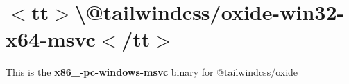 \chapter{\texorpdfstring{$<$}{<}tt\texorpdfstring{$>$}{>}\textbackslash{}@tailwindcss/oxide-\/win32-\/x64-\/msvc\texorpdfstring{$<$}{<}/tt\texorpdfstring{$>$}{>}}
\hypertarget{md__project5___h_r_2_project5___h_r___front___end_2node__modules_2_0dtailwindcss_2oxide-win32-x64-msvc_2_r_e_a_d_m_e}{}\label{md__project5___h_r_2_project5___h_r___front___end_2node__modules_2_0dtailwindcss_2oxide-win32-x64-msvc_2_r_e_a_d_m_e}
\label{md__project5___h_r_2_project5___h_r___front___end_2node__modules_2_0dtailwindcss_2oxide-win32-x64-msvc_2_r_e_a_d_m_e_autotoc_md402}%
%
 This is the {\bfseries{x86\+\_-\/pc-\/windows-\/msvc}} binary for {\ttfamily @tailwindcss/oxide} 